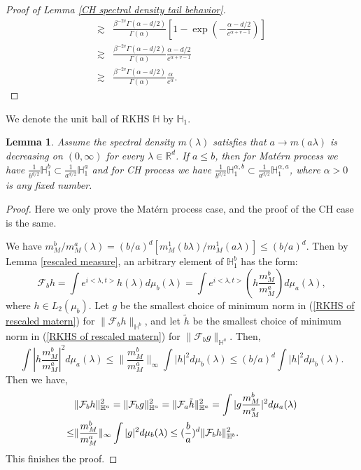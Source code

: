 \documentclass[ejs,noshowframe]{imsart}
\theoremstyle{plain}
\newtheorem{lemma}[theorem]{Lemma}
\theoremstyle{definition}
\theoremstyle{remark}
\begin{document}
\begin{appendix}
\begin{proof}[Proof of Lemma \ref{CH spectral density tail behavior}]
\begin{displaymath}
\begin{split}
\gtrsim&\frac{\beta^{-2v}\Gamma(\alpha-d/2)}{\Gamma(\alpha)}\left[1-\exp\left(-{ \frac{\alpha-d/2}{e^{ \alpha+v-1}}}\right)\right]\\
\gtrsim& \frac{\beta^{-2v}\Gamma(\alpha-d/2)}{\Gamma(\alpha)}{ \frac{\alpha-d/2}{e^{ \alpha+v-1}}}\\
\gtrsim&\frac{\beta^{-2v}\Gamma(\alpha-d/2)}{\Gamma(\alpha)}\frac{\alpha}{e^\alpha}. 
\end{split}
\end{displaymath}
\end{proof}

\noindent
We denote the unit ball of RKHS $\mathbb{H}$ by $\mathbb{H}_1$.
\begin{lemma} \label{rescaled hilbert inclusion}
    Assume the spectral density $m(\lambda)$ satisfies  that $a \to m(a \lambda)$ is decreasing on $(0, \infty)$ for every $\lambda \in \mathbb{R}^d$. If $a \leq b$, then for Mat\'ern process we have $\frac{1}{b^{d/2}}\mathbb{H}_1^b \subset \frac{1}{a^{d/2}}\mathbb{H}_1^a$ and for CH process we have $\frac{1}{b^{d/2}}\mathbb{H}_1^{\alpha,b} \subset \frac{1}{a^{d/2}}\mathbb{H}_1^{\alpha,a}$, where $\alpha>0$ is any fixed number.
\end{lemma}
\begin{proof}
Here we only prove the Mat\'ern process case, and the proof of the CH case is the same.

We have $m_M^b/m_M^a(\lambda)=(b/a)^d [m_M^1(b \lambda) /m_M^1(a \lambda) ]\leq (b/a)^d$. Then by Lemma \ref{rescaled measure}, an arbitrary element of $\mathbb{H}_1^b$ has the form:
$$
\mathcal{F}_b h= \int e^{i <\lambda,t>} h(\lambda) d \mu_b(\lambda)=\int e^{i <\lambda,t>} \left(h\frac{m_M^b}{m_M^a}\right)d \mu_a(\lambda),
$$
where $h \in L_2(\mu_b)$. Let $g$ be the  smallest choice of minimum norm  in (\ref{RKHS of rescaled matern}) for $\|\mathcal{F}_b h\|_{\mathbb{H}^b}$,
and let $\tilde{h}$ be the  smallest choice of minimum norm  in (\ref{RKHS of rescaled matern}) for $\|\mathcal{F}_b g\|_{\mathbb{H}^a}$. Then,
$$
\int |h\frac{m_M^b}{m_M^a}|^2d \mu_a(\lambda) \leq \|\frac{m_M^b}{m_M^a}\|_{\infty}\int |h|^2 d \mu_b(\lambda) \leq (b/a)^{d}\int |h|^2d \mu_b(\lambda).
$$
Then we have, 
\begin{displaymath} 
\begin{split}
&\|\mathcal{F}_b h\|^2_{\mathbb{H}^a}=\|\mathcal{F}_b g\|^2_{\mathbb{H}^a}=
\|\mathcal{F}_a \Tilde{h}\|^2_{\mathbb{H}^a}=
\int |g\frac{m_M^b}{m_M^a}|^2d \mu_a(\lambda)
\\
\leq &\|\frac{m_M^b}{m_M^a}\|_{\infty}\int |g|^2 d \mu_b(\lambda) \leq (\frac{b}{a})^d \|\mathcal{F}_b h\|^2_{\mathbb{H}^b}.
\end{split}
\end{displaymath}
This finishes the proof.


\end{proof}
\end{appendix}
\end{document}
